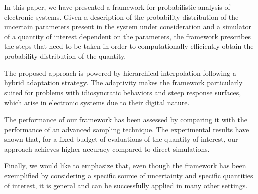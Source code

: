 In this paper, we have presented a framework for probabilistic analysis of
electronic systems. Given a description of the probability distribution of the
uncertain parameters present in the system under consideration and a simulator
of a quantity of interest dependent on the parameters, the framework prescribes
the steps that need to be taken in order to computationally efficiently obtain
the probability distribution of the quantity.

The proposed approach is powered by hierarchical interpolation following a
hybrid adaptation strategy. The adaptivity makes the framework particularly
suited for problems with idiosyncratic behaviors and steep response surfaces,
which arise in electronic systems due to their digital nature.

The performance of our framework has been assessed by comparing it with the
performance of an advanced sampling technique. The experimental results have
shown that, for a fixed budget of evaluations of the quantity of interest, our
approach achieves higher accuracy compared to direct simulations.

Finally, we would like to emphasize that, even though the framework has been
exemplified by considering a specific source of uncertainty and specific
quantities of interest, it is general and can be successfully applied in many
other settings.
